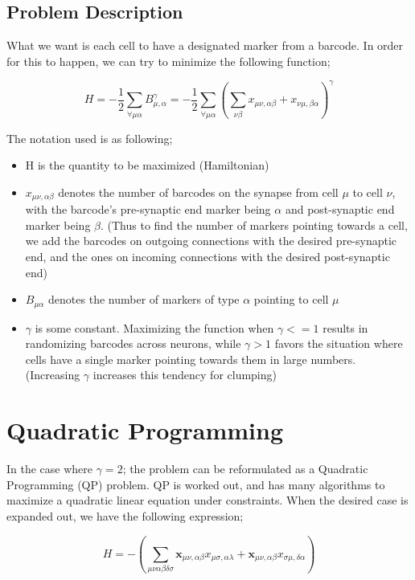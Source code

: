 \documentclass[%
 reprint,
 amsmath,amssymb,
 aps,
]{revtex4-1}
\begin{document}
\subsection{\label{sec:prob} Problem Description}
What we want is each cell to have a designated marker from a barcode. In order for this to happen, we can try to minimize the following function;

\begin{equation}
H = -\frac{1}{2}\sum_{\forall \mu \alpha}B_{\mu,\alpha}^{\gamma} = -\frac{1}{2} \sum_{\forall \mu \alpha} \left( \sum_{\nu \beta} x_{\mu\nu , \alpha \beta} + x_{\nu\mu , \beta\alpha} \right)^{\gamma}
\end{equation}

The notation used is as following;
\begin{itemize}
	\item H is the quantity to be maximized (Hamiltonian)
	\item $x_{\mu\nu , \alpha\beta}$ denotes the number of barcodes on the synapse from cell $\mu$ to cell $\nu$, with the barcode's pre-synaptic end marker being $\alpha$ and post-synaptic end marker being $\beta$. (Thus to find the number of markers pointing towards a cell, we add the barcodes on outgoing connections with the desired pre-synaptic end, and the ones on incoming connections with the desired post-synaptic end)
	\item $B_{\mu \alpha}$ denotes the number of markers of type $\alpha$ pointing to cell $\mu$
	\item $\gamma$ is some constant. Maximizing the function when $\gamma <= 1$ results in randomizing barcodes across neurons, while $\gamma > 1$ favors the situation where cells have a single marker pointing towards them in large numbers. (Increasing $\gamma$ increases this tendency for clumping)
\end{itemize}


\section{\label{sec:qp}Quadratic Programming}
 In the case where $\gamma=2$; the problem can be reformulated as a Quadratic Programming (QP) problem. QP is worked out, and has many algorithms to maximize a quadratic linear equation under constraints. When the desired case is expanded out, we have the following expression;
 
 \begin{equation}
 	H = - \left(\sum_{\mu \nu \alpha \beta \delta \sigma} \mathbf{x}_{\mu\nu,\alpha\beta}x_{\mu\sigma,\alpha\lambda} + \mathbf{x}_{\mu\nu,\alpha\beta}x_{\sigma\mu,\delta\alpha} \right)
 \end{equation}
\end{document}
